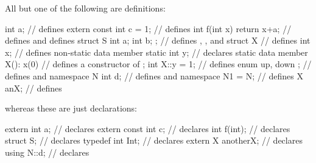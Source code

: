 \begin{example} All but one of the following are definitions:
%
\begin{codeblock}
int a;                          // defines 
extern const int c = 1;         // defines 
int f(int x) { return x+a; }    // defines  and defines 
struct S { int a; int b; };     // defines , , and 
struct X {                      // defines 
  int x;                        // defines non-static data member 
  static int y;                 // declares static data member 
  X(): x(0) { }                 // defines a constructor of 
};
int X::y = 1;                   // defines 
enum { up, down };              // defines  and 
namespace N { int d; }          // defines  and 
namespace N1 = N;               // defines 
X anX;                          // defines 

\end{codeblock}
whereas these are just declarations:
%
\begin{codeblock}
extern int a;                   // declares 
extern const int c;             // declares 
int f(int);                     // declares 
struct S;                       // declares 
typedef int Int;                // declares 
extern X anotherX;              // declares 
using N::d;                     // declares 
\end{codeblock}
\end{example}

